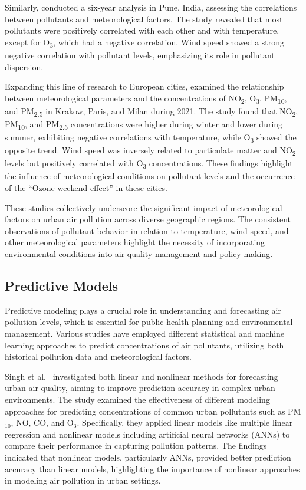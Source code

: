 \documentclass[twoside,11pt]{article}
\begin{document}
Similarly, \citep{refId0} conducted a six-year analysis in Pune, India, assessing the correlations between pollutants and meteorological factors. The study revealed that most pollutants were positively correlated with each other and with temperature, except for O\textsubscript{3}, which had a negative correlation. Wind speed showed a strong negative correlation with pollutant levels, emphasizing its role in pollutant dispersion.

Expanding this line of research to European cities, \citep{Rowland2024} examined the relationship between meteorological parameters and the concentrations of NO\textsubscript{2}, O\textsubscript{3}, PM\textsubscript{10}, and PM\textsubscript{2.5} in Krakow, Paris, and Milan during 2021. The study found that NO\textsubscript{2}, PM\textsubscript{10}, and PM\textsubscript{2.5} concentrations were higher during winter and lower during summer, exhibiting negative correlations with temperature, while O\textsubscript{3} showed the opposite trend. Wind speed was inversely related to particulate matter and NO\textsubscript{2} levels but positively correlated with O\textsubscript{3} concentrations. These findings highlight the influence of meteorological conditions on pollutant levels and the occurrence of the “Ozone weekend effect” in these cities.

These studies collectively underscore the significant impact of meteorological factors on urban air pollution across diverse geographic regions. The consistent observations of pollutant behavior in relation to temperature, wind speed, and other meteorological parameters highlight the necessity of incorporating environmental conditions into air quality management and policy-making.


\subsection{Predictive Models}

Predictive modeling plays a crucial role in understanding and forecasting air pollution levels, which is essential for public health planning and environmental management. Various studies have employed different statistical and machine learning approaches to predict concentrations of air pollutants, utilizing both historical pollution data and meteorological factors.

Singh et al.\ \citep{SINGH2012244} investigated both linear and nonlinear methods for forecasting urban air quality, aiming to improve prediction accuracy in complex urban environments. The study examined the effectiveness of different modeling approaches for predicting concentrations of common urban pollutants such as PM$_{10}$, NO, CO, and O$_3$. Specifically, they applied linear models like multiple linear regression and nonlinear models including artificial neural networks (ANNs) to compare their performance in capturing pollution patterns. The findings indicated that nonlinear models, particularly ANNs, provided better prediction accuracy than linear models, highlighting the importance of nonlinear approaches in modeling air pollution in urban settings.
\end{document}
